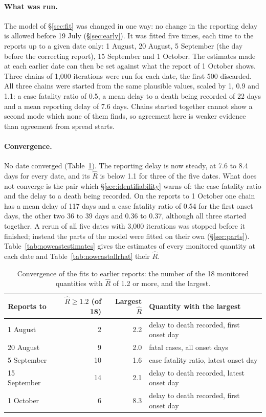 \documentclass[11pt,a4paper]{article}
\begin{document}
\paragraph{What was run.} The model of \S\ref{sec:fit} was changed in one
way: no change in the reporting delay is allowed before 19 July
(\S\ref{sec:early}). It was fitted five times, each time to the reports up
to a given date only: 1 August, 20 August, 5 September (the day before the
correcting report), 15 September and 1 October. The estimates made at each
earlier date can then be set against what the report of 1 October shows.
Three chains of 1{,}000 iterations were run for each date, the first 500
discarded. All three chains were started from the same plausible values,
scaled by 1, 0.9 and 1.1: a case fatality ratio of 0.5, a mean delay to a
death being recorded of 22 days and a mean reporting delay of 7.6 days.
Chains started together cannot show a second mode which none of them
finds, so agreement here is weaker evidence than agreement from spread
starts.

\paragraph{Convergence.} No date converged (Table~\ref{tab:nowcastrhat}).
The reporting delay is now steady, at 7.6 to 8.4 days for every date, and
its $\hat{R}$ is below 1.1 for three of the five dates. What does not
converge is the pair which \S\ref{sec:identifiability} warns of: the case
fatality ratio and the delay to a death being recorded. On the reports to 1
October one chain has a mean delay of 117 days and a case fatality ratio of
0.54 for the first onset days, the other two 36 to 39 days and 0.36 to
0.37, although all three started together. A rerun of all five dates with
3{,}000 iterations was stopped before it finished; instead the parts of the
model were fitted on their own (\S\ref{sec:parts}).
Table~\ref{tab:nowcastestimates} gives the estimates of
every monitored quantity at each date and Table~\ref{tab:nowcastallrhat}
their $\hat{R}$.

\begin{table}[h]
\centering
\begin{tabular}{lrrl}
\toprule
Reports to & $\hat{R}\ge 1.2$ (of 18) & Largest $\hat{R}$ & Quantity with the largest\\
\midrule
1 August & 2 & 2.2 & delay to death recorded, first onset day\\
20 August & 9 & 2.0 & fatal cases, all onset days\\
5 September & 10 & 1.6 & case fatality ratio, latest onset day\\
15 September & 14 & 2.1 & delay to death recorded, latest onset day\\
1 October & 6 & 8.3 & delay to death recorded, first onset day\\
\bottomrule
\end{tabular}
\caption{Convergence of the fits to earlier reports: the number of the 18
monitored quantities with $\hat{R}$ of 1.2 or more, and the largest.}
\label{tab:nowcastrhat}
\end{table}
\end{document}
